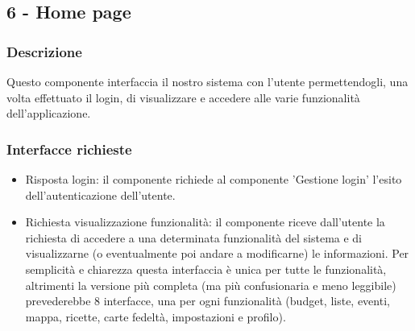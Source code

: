 \documentclass[a4paper,12pt]{article}
\begin{document}
\subsection*{6 -  Home page}
\subsubsection*{Descrizione}
Questo componente interfaccia il nostro sistema con l'utente permettendogli, una volta effettuato il login, di visualizzare e accedere alle varie funzionalità dell'applicazione. 
\subsubsection*{Interfacce richieste}
\begin{itemize} \setlength\itemsep{0.01em}
\item {\sffamily Risposta login}: il componente richiede al componente 'Gestione login' l'esito dell'autenticazione dell'utente.
\item {\sffamily Richiesta visualizzazione funzionalità}: il componente riceve dall'utente la richiesta di accedere a una determinata funzionalità del sistema e di visualizzarne (o eventualmente poi andare a modificarne) le informazioni. Per semplicità e chiarezza questa interfaccia è unica per tutte le funzionalità, altrimenti la versione più completa (ma più confusionaria e meno leggibile) prevederebbe 8 interfacce, una per ogni funzionalità (budget, liste, eventi, mappa, ricette, carte fedeltà, impostazioni e profilo).

\end{itemize}
\end{document}
